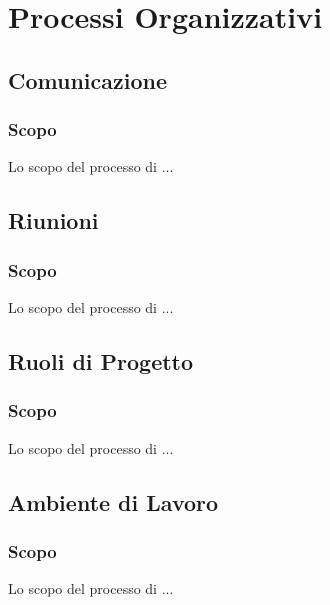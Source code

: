 \section{Processi Organizzativi}
\label{organizzativi}


\subsection{Comunicazione}
\subsubsection{Scopo}
Lo scopo del processo di ...

\subsection{Riunioni}
\subsubsection{Scopo}
Lo scopo del processo di ...

\subsection{Ruoli di Progetto}
\subsubsection{Scopo}
Lo scopo del processo di ...

\subsection{Ambiente di Lavoro}
\subsubsection{Scopo}
Lo scopo del processo di ...